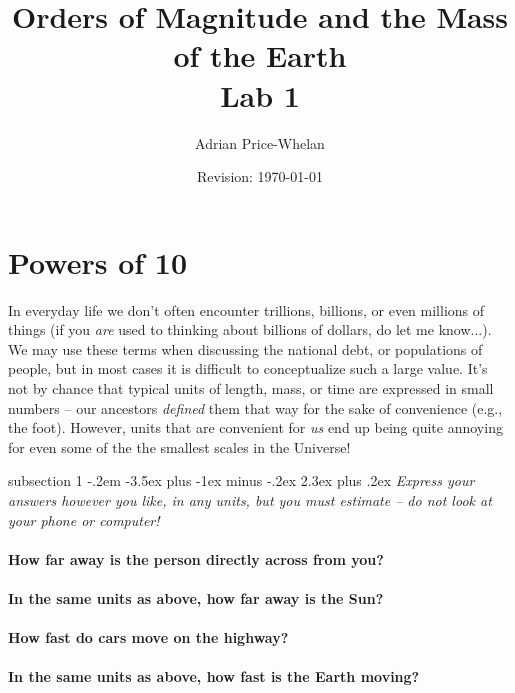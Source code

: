\documentclass[12pt]{article}
\makeatletter
\newenvironment{problem}{\@startsection
       {subsection}
       {1}
       {-.2em}
       {-3.5ex plus -1ex minus -.2ex}
       {2.3ex plus .2ex}
       {\pagebreak[3]%
       \normalsize\bf\noindent{Problem }
       }
       }
       {%
       }
\makeatother
\begin{document}
\title{Orders of Magnitude and the Mass of the Earth \\ \large \textbf{Lab 1}}
\author{Adrian Price-Whelan}
\date{\small Revision: \today}

\maketitle

\thispagestyle{empty}

\section{\large Powers of 10}
\indent\indent In everyday life we don't often encounter trillions, billions, or even millions of things (if you \textit{are} used to thinking about billions of dollars, do let me know...). We may use these terms when discussing the national debt, or populations of people, but in most cases it is difficult to conceptualize such a large value. It's not by chance that typical units of length, mass, or time are expressed in small numbers -- our ancestors \textit{defined} them that way for the sake of convenience (e.g., the foot). However, units that are convenient for \textit{us} end up being quite annoying for even some of the the smallest scales in the Universe! 


\begin{problem}{ }
	\textit{Express your answers however you like, in any units, but you must estimate -- do not look at your phone or computer!}  \\ \\
	\textbf{How far away is the person directly across from you?} \hrulefill \\ \\
	\textbf{In the same units as above, how far away is the Sun?} \hrulefill \\ \\
	\textbf{How fast do cars move on the highway?} \hrulefill \\ \\
	\textbf{In the same units as above, how fast is the Earth moving?} \hrulefill 
\end{problem}
\end{document}
